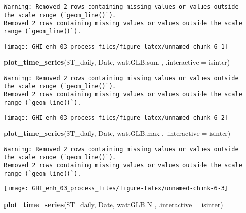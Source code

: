 \documentclass[
  10pt,
  a4paper,oneside]{article}
\newenvironment{Shaded}{\begin{snugshade}}{\end{snugshade}}
\newcommand{\AttributeTok}[1]{\textcolor[rgb]{0.13,0.29,0.53}{#1}}
\newcommand{\FunctionTok}[1]{\textcolor[rgb]{0.13,0.29,0.53}{\textbf{#1}}}
\newcommand{\NormalTok}[1]{#1}
\begin{document}
\begin{verbatim}
Warning: Removed 2 rows containing missing values or values outside the scale range (`geom_line()`).
Removed 2 rows containing missing values or values outside the scale range (`geom_line()`).
\end{verbatim}

\begin{center}\texttt{[image: GHI\_enh\_03\_process\_files/figure-latex/unnamed-chunk-6-1]} \end{center}

\begin{Shaded}
\begin{Highlighting}[]
\FunctionTok{plot\_time\_series}\NormalTok{(ST\_daily, Date, wattGLB.sum , }\AttributeTok{.interactive =}\NormalTok{ isinter)}
\end{Highlighting}
\end{Shaded}

\begin{verbatim}
Warning: Removed 2 rows containing missing values or values outside the scale range (`geom_line()`).
Removed 2 rows containing missing values or values outside the scale range (`geom_line()`).
\end{verbatim}

\begin{center}\texttt{[image: GHI\_enh\_03\_process\_files/figure-latex/unnamed-chunk-6-2]} \end{center}

\begin{Shaded}
\begin{Highlighting}[]
\FunctionTok{plot\_time\_series}\NormalTok{(ST\_daily, Date, wattGLB.max , }\AttributeTok{.interactive =}\NormalTok{ isinter)}
\end{Highlighting}
\end{Shaded}

\begin{verbatim}
Warning: Removed 2 rows containing missing values or values outside the scale range (`geom_line()`).
Removed 2 rows containing missing values or values outside the scale range (`geom_line()`).
\end{verbatim}

\begin{center}\texttt{[image: GHI\_enh\_03\_process\_files/figure-latex/unnamed-chunk-6-3]} \end{center}

\begin{Shaded}
\begin{Highlighting}[]
\FunctionTok{plot\_time\_series}\NormalTok{(ST\_daily, Date, wattGLB.N   , }\AttributeTok{.interactive =}\NormalTok{ isinter)}
\end{Highlighting}
\end{Shaded}
\end{document}

